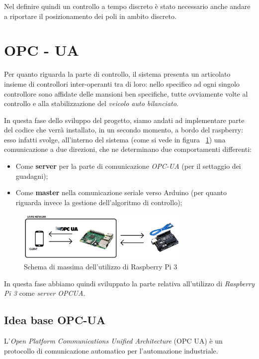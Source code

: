 Nel definire quindi un controllo a tempo discreto è stato necessario anche andare a riportare il posizionamento dei poli in ambito discreto.

\section{OPC - UA}
Per quanto riguarda la parte di controllo, il sistema presenta un articolato insieme di controllori inter-operanti tra di loro: nello specifico ad ogni singolo controllore sono affidate delle mansioni ben specifiche, tutte ovviamente volte al controllo e alla stabilizzazione del \textit{veicolo auto bilanciato}.

In questa fase dello sviluppo del progetto, siamo andati ad implementare parte del codice che verrà installato, in un secondo momento, a bordo del raspberry: esso infatti svolge, all'interno del sistema (come si vede in figura ~\ref{fig:OPCUA_schema}) una comunicazione a due direzioni, che ne determinano due comportamenti differenti:
\begin{itemize}
	\item Come \textbf{server} per la parte di comunicazione \textit{OPC-UA} (per il settaggio dei guadagni);
	\item Come \textbf{master} nella comunicazione seriale verso Arduino (per quanto riguarda invece la gestione dell'algoritmo di controllo);
\end{itemize}

 \begin{figure}[H]
	\centering   	
	\includegraphics[width=0.75\textwidth]{Immagini/OPCUA_schema.png}
	\caption{Schema di massima dell'utilizzo di Raspberry Pi 3}
	\label{fig:OPCUA_schema}
\end{figure}

In questa fase abbiamo quindi sviluppato la parte relativa all'utilizzo di \textit{Raspberry Pi 3} come \textit{server OPCUA}.

\subsection{Idea base OPC-UA}
L'\textit{Open Platform Communications Unified Architecture} (OPC UA) è un protocollo di comunicazione automatico per l'automazione industriale. 

